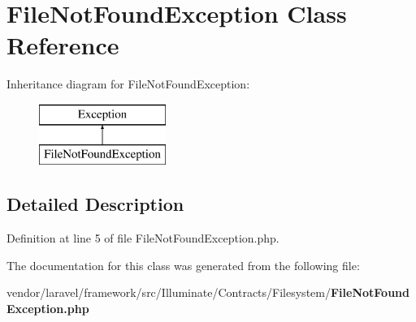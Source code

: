 \section{File\+Not\+Found\+Exception Class Reference}
\label{class_illuminate_1_1_contracts_1_1_filesystem_1_1_file_not_found_exception}
Inheritance diagram for File\+Not\+Found\+Exception\+:\begin{figure}[H]
\begin{center}
\leavevmode
\includegraphics[height=2.000000cm]{class_illuminate_1_1_contracts_1_1_filesystem_1_1_file_not_found_exception}
\end{center}
\end{figure}


\subsection{Detailed Description}


Definition at line 5 of file File\+Not\+Found\+Exception.\+php.



The documentation for this class was generated from the following file\+:\begin{DoxyCompactItemize}
\item 
vendor/laravel/framework/src/\+Illuminate/\+Contracts/\+Filesystem/{\bf File\+Not\+Found\+Exception.\+php}\end{DoxyCompactItemize}

